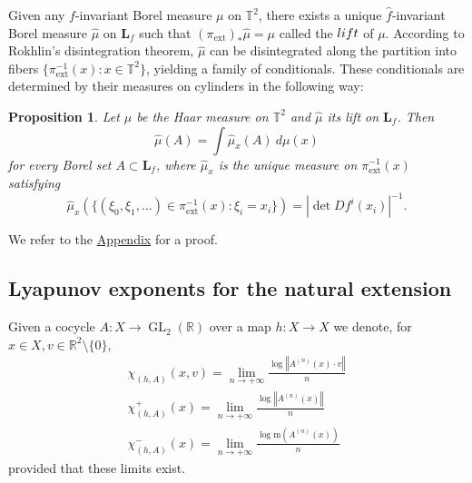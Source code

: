 \documentclass[11pt,letterpaper,reqno]{article}
\newtheorem{proposition}{Proposition}[section]
\newcommand{\norm}[1]{\left\Vert#1\right\Vert}
\newcommand{\conorm}[1]{\mathrm{m}\left(#1\right)}
\newcommand{\Real}{\mathbb R}
\newcommand{\TT}{\mathbb{T}^2}
\newcommand{\RR}{\mathbb{R}^2}
\newcommand{\hTTf}[1][f]{\mathbf{L}_{#1}}
\newcommand{\hf}{\hat{f}}
\newcommand{\hmu}{\hat{\mu}}
\DeclareMathOperator{\GL}{GL}
\newcommand{\pext}{\pi_{\mathrm{ext}}}
\begin{document}
Given any $f$-invariant Borel measure $\mu$ on $\TT$, there exists a unique $\hf$-invariant Borel measure $\hmu$ on $\hTTf$ such that $(\pext)_* \hmu = \mu$ called the $\emph{lift}$ of $\mu$. According to Rokhlin's disintegration theorem, $\hmu$ can be disintegrated along the partition into fibers $\{\pext^{-1}(x): x \in \TT \}$, yielding a family of conditionals. These conditionals are determined by their measures on cylinders in the following way: 
\begin{proposition}\label{pro:desintegracionhmu}
Let $\mu$ be the Haar measure on $\TT$ and $\hmu$ its lift on $\hTTf$. Then
\begin{equation}\label{muhat}
\hmu(A) = \int \hmu_x(A) \ d\mu(x)
\end{equation}
for every Borel set $A \subset \hTTf$, where $\hmu_x$ is the unique measure on $\pext^{-1}(x)$ satisfying
\begin{equation}
\hmu_x(\{(\xi_0, \xi_1, \ldots) \in \pext^{-1}(x): \xi_i = x_i\}) = | \det Df^i(x_i)|^{-1}.
\end{equation}
\end{proposition}

We refer to the \hyperlink{sec:appendix}{Appendix} for a proof.


\subsection{Lyapunov exponents for the natural extension}\label{sub:lyapunov_exponents_for_the_natural_extension}

Given a cocycle $A:X\to \GL_2(\Real)$ over a map $h:X\to X$ we denote, for $x\in X, v\in\RR\setminus\{0\}$,
\begin{align*}
\chi_{(h,A)}(x,v)=\lim_{n\to+\infty}\frac{\log\norm{A^{(n)}(x)\cdot v}}{n}\\
\chi_{(h,A)}^+(x)=\lim_{n\to+\infty}\frac{\log\norm{A^{(n)}(x)}}{n}\\
\chi_{(h,A)}^-(x)=\lim_{n\to+\infty}\frac{\log\conorm{A^{(n)}(x)}}{n}
\end{align*}
provided that these limits exist.
\end{document}
